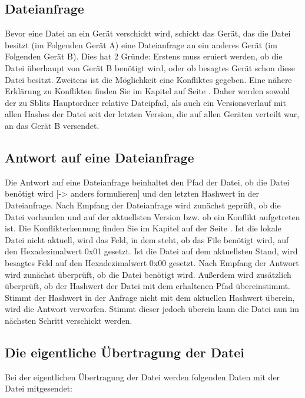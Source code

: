 \subsection{Dateianfrage}
Bevor eine Datei an ein Gerät verschickt wird, schickt das Gerät, das die Datei besitzt (im Folgenden Gerät A) eine Dateianfrage an ein anderes Gerät (im Folgenden Gerät B). Dies hat 2 Gründe: Erstens muss eruiert werden, ob die Datei überhaupt von Gerät B benötigt wird, oder ob besagtes Gerät schon diese Datei besitzt. Zweitens ist die Möglichkeit eine Konfliktes gegeben. Eine nähere Erklärung zu Konflikten finden Sie im Kapitel  auf Seite \pageref{Konflikt}. Daher werden sowohl der zu Sblits Hauptordner relative Dateipfad, als auch ein Versionsverlauf mit allen Hashes der Datei seit der letzten Version, die auf allen Geräten verteilt war, an das Gerät B versendet. 

\subsection{Antwort auf eine Dateianfrage}
Die Antwort auf eine Dateianfrage beinhaltet den Pfad der Datei, ob die Datei benötigt wird [-> anders formulieren] und den letzten Hashwert in der Dateianfrage. Nach Empfang der Dateianfrage wird zunächst geprüft, ob die Datei vorhanden und auf der aktuellsten Version bzw. ob ein Konflikt aufgetreten ist. Die Konflikterkennung finden Sie im Kapitel  auf der Seite \pageref{Konflikterkennung}. Ist die lokale Datei nicht aktuell, wird das Feld, in dem steht, ob das File benötigt wird, auf den Hexadezimalwert 0x01 gesetzt. Ist die Datei auf dem aktuellsten Stand, wird besagtes Feld auf den Hexadezimalwert 0x00 gesetzt. 
Nach Empfang der Antwort wird zunächst überprüft, ob die Datei benötigt wird. Außerdem wird zusätzlich überprüft, ob der Hashwert der Datei mit dem erhaltenen Pfad übereinstimmt. Stimmt der Hashwert in der Anfrage nicht mit dem aktuellen Hashwert überein, wird die Antwort verworfen. Stimmt dieser jedoch überein kann die Datei nun im nächsten Schritt verschickt werden.

\subsection{Die eigentliche Übertragung der Datei}
Bei der eigentlichen Übertragung der Datei werden folgenden Daten mit der Datei mitgesendet:
